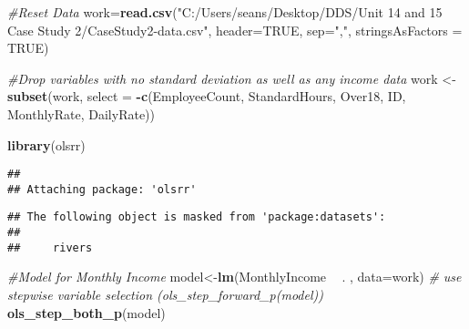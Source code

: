 \documentclass[]{article}
\newenvironment{Shaded}{\begin{snugshade}}{\end{snugshade}}
\newcommand{\CommentTok}[1]{\textcolor[rgb]{0.56,0.35,0.01}{\textit{#1}}}
\newcommand{\DataTypeTok}[1]{\textcolor[rgb]{0.13,0.29,0.53}{#1}}
\newcommand{\KeywordTok}[1]{\textcolor[rgb]{0.13,0.29,0.53}{\textbf{#1}}}
\newcommand{\NormalTok}[1]{#1}
\newcommand{\OperatorTok}[1]{\textcolor[rgb]{0.81,0.36,0.00}{\textbf{#1}}}
\newcommand{\OtherTok}[1]{\textcolor[rgb]{0.56,0.35,0.01}{#1}}
\newcommand{\StringTok}[1]{\textcolor[rgb]{0.31,0.60,0.02}{#1}}
\begin{document}
\begin{Shaded}
\begin{Highlighting}[]
\CommentTok{#Reset Data}
\NormalTok{work=}\KeywordTok{read.csv}\NormalTok{(}\StringTok{"C:/Users/seans/Desktop/DDS/Unit 14 and 15 Case Study 2/CaseStudy2-data.csv"}\NormalTok{, }\DataTypeTok{header=}\OtherTok{TRUE}\NormalTok{, }\DataTypeTok{sep=}\StringTok{","}\NormalTok{, }\DataTypeTok{stringsAsFactors =} \OtherTok{TRUE}\NormalTok{)}

\CommentTok{#Drop variables with no standard deviation as well as any income data}
\NormalTok{work <-}\StringTok{ }\KeywordTok{subset}\NormalTok{(work, }\DataTypeTok{select =} \OperatorTok{-}\KeywordTok{c}\NormalTok{(EmployeeCount, StandardHours, Over18, ID, MonthlyRate, DailyRate))}


\KeywordTok{library}\NormalTok{(olsrr)}
\end{Highlighting}
\end{Shaded}

\begin{verbatim}
## 
## Attaching package: 'olsrr'
\end{verbatim}

\begin{verbatim}
## The following object is masked from 'package:datasets':
## 
##     rivers
\end{verbatim}

\begin{Shaded}
\begin{Highlighting}[]
\CommentTok{#Model for Monthly Income}
\NormalTok{model<-}\KeywordTok{lm}\NormalTok{(MonthlyIncome }\OperatorTok{~}\StringTok{ }\NormalTok{. , }\DataTypeTok{data=}\NormalTok{work)}
\CommentTok{# use stepwise variable selection (ols_step_forward_p(model))}
\KeywordTok{ols_step_both_p}\NormalTok{(model)}
\end{Highlighting}
\end{Shaded}
\end{document}
